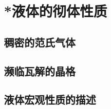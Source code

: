 

\section{*液体的彻体性质}\label{12-3}

\subsection{稠密的范氏气体}\label{12-3-1}

\subsection{濒临瓦解的晶格}\label{12-3-2}

\subsection{液体宏观性质的描述}\label{12-3-3}